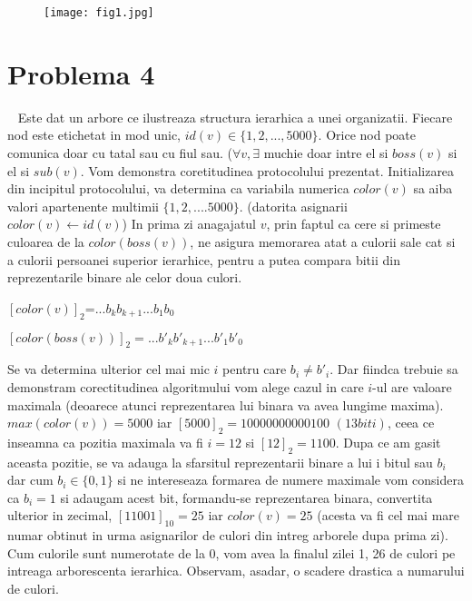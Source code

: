 \documentclass{article}
\begin{document}
\begin{center}
\begin{figure}[h]
\centering
\texttt{[image: fig1.jpg]}
\end{figure}
\end{center}

\section{Problema 4}
\
\newline
Este dat un arbore ce ilustreaza structura ierarhica  a unei organizatii. Fiecare nod este etichetat in mod unic, $id(v) \in \{1,2,...,5000\}$. Orice nod poate comunica doar cu tatal sau cu fiul sau. ($\forall v, \exists$ muchie doar intre el si $boss(v)$ si el si $sub(v)$.
\newline
\newline
Vom demonstra coretitudinea protocolului prezentat.
\newline
\newline
Initializarea din incipitul protocolului, va determina ca variabila numerica $color(v)$ sa aiba valori apartenente multimii $\{1,2,....5000\}$. (datorita asignarii $color(v) \leftarrow id(v)$)
\newline
In prima zi anagajatul $v$, prin faptul ca cere si primeste culoarea de la $color(boss(v))$, ne asigura memorarea atat a culorii sale cat si a culorii persoanei superior ierarhice, pentru a putea compara bitii din reprezentarile binare ale celor doua culori. 
\newline
\begin{center}
$[color(v)]_2$=$...b_k b_{k+1}...b_1 b_0$
\end{center}
\begin{center}
$[color(boss(v))]_2=...b'_k b'_{k+1}...b'_1 b'_0 $
\end{center}
Se va determina ulterior cel mai mic $i$ pentru care $b_i \not = b'_i$. Dar fiindca trebuie sa demonstram corectitudinea algoritmului vom alege cazul in care $i$-ul are valoare maximala (deoarece atunci reprezentarea lui binara va avea lungime maxima). $max(color(v))=5000$ iar $[5000]_2=10000000000100$ $(13 biti)$, ceea ce inseamna ca pozitia maximala va fi $i=12$ si $[12]_2=1100$. 
\newline
\newline
Dupa ce am gasit aceasta pozitie, se va adauga la sfarsitul reprezentarii binare a lui i bitul sau $b_i$ dar cum $b_i \in \{0,1\}$ si ne intereseaza formarea de numere maximale vom considera ca $b_i=1$ si adaugam acest bit, formandu-se reprezentarea binara, convertita ulterior in   zecimal, $[11001]_{10}=25$ iar $color(v)=25$ (acesta va fi cel mai mare numar obtinut in urma asignarilor de culori din intreg arborele dupa prima zi). Cum culorile sunt numerotate de la 0, vom avea la finalul zilei 1, 26 de culori pe intreaga arborescenta ierarhica. Observam, asadar, o scadere drastica a numarului de culori.
\end{document}
